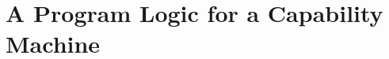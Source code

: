 \documentclass[sigplan,review]{acmart}\settopmatter{printfolios=true,printccs=false,printacmref=false}
\begin{document}





\section{A Program Logic for a Capability Machine}
\end{document}
